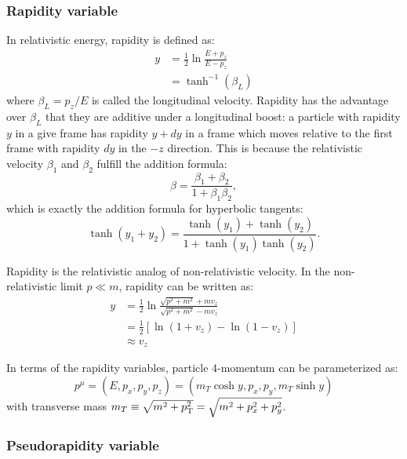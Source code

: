 \subsubsection{Rapidity variable}

In relativistic energy, rapidity is defined as:
\begin{equation}
\begin{split}
y &= \frac{1}{2} \ln \frac{E+p_z}{E-p_z} \\
&= \tanh^{-1}(\beta_L)
\end{split}
\end{equation}
where $\beta_L = p_z / E$ is called the longitudinal velocity. Rapidity has the advantage over $\beta_L$ that they are additive under a longitudinal boost: a particle with rapidity $y$ in a give frame has rapidity $y + dy$ in a frame which moves relative to the first frame with rapidity $dy$ in the $-z$ direction. This is because the relativistic velocity $\beta_1$ and $\beta_2$ fulfill the addition formula:
\begin{equation}
\beta = \frac{\beta_1 + \beta_2}{1 + \beta_1 \beta_2},
\end{equation}
which is exactly the addition formula for hyperbolic tangents:
\begin{equation}
\tanh (y_1 + y_2) = \frac{\tanh(y_1) + \tanh(y_2)}{1 + \tanh(y_1)\tanh(y_2)}.
\end{equation}

Rapidity is the relativistic analog of non-relativistic velocity. In the non-relativistic limit $p \ll m$, rapidity can be written as:
\begin{equation}
\begin{split}
y &= \frac{1}{2} \ln \frac{\sqrt{p^2 + m^2} + mv_z}{\sqrt{p^2 + m^2} - mv_z} \\
&= \frac{1}{2} [\ln(1+v_z) - \ln(1-v_z)] \\
&\approx v_z
\end{split}
\end{equation}

In terms of the rapidity variables, particle 4-momentum can be parameterized as:
\begin{equation}
p^\mu = (E, p_x, p_y, p_z) = (m_T \cosh y, p_x, p_y, m_T \sinh y)
\end{equation}
with transverse mass $m_T \equiv \sqrt{m^2 + p_\text{T}^2} = \sqrt{m^2 + p_x^2 + p_y^2}$.



\subsubsection{Pseudorapidity variable}


